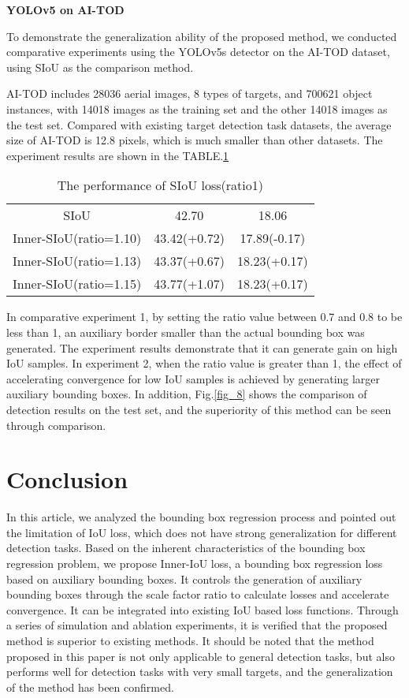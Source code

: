 \documentclass[lettersize,journal]{IEEEtran}
\begin{document}
	\newline
	\newline
	\textbf {YOLOv5 on AI-TOD}
	\par To demonstrate the generalization ability of the proposed method, we conducted comparative experiments using the YOLOv5s detector on the AI-TOD dataset\cite{ref21}, using SIoU\cite{ref5} as the comparison method.
	
	AI-TOD includes 28036 aerial images, 8 types of targets, and 700621 object instances, with 14018 images as the training set and the other 14018 images as the test set. Compared with existing target detection task datasets, the average size of AI-TOD is 12.8 pixels, which is much smaller than other datasets. The experiment results are shown in the TABLE.\ref{tab:mytable2}
	\begin{table}[h]
		\centering
		\begin{tabular}{ccc}
			\toprule &  &  \\
			\midrule SIoU & 42.70 & 18.06 \\
			Inner-SIoU(ratio=1.10) & 43.42(+0.72) & 17.89(-0.17) \\
			Inner-SIoU(ratio=1.13) & 43.37(+0.67) & 18.23(+0.17) \\
			Inner-SIoU(ratio=1.15) & 43.77(+1.07) & 18.23(+0.17) \\
			\bottomrule \end{tabular}
		\caption{The performance of SIoU loss(ratio1)}
		\label{tab:mytable2}
	\end{table}
	\par In comparative experiment 1, by setting the ratio value between 0.7 and 0.8 to be less than 1, an auxiliary border smaller than the actual bounding box was generated. The experiment results demonstrate that it can generate gain on high IoU samples. In experiment 2, when the ratio value is greater than 1, the effect of accelerating convergence for low IoU samples is achieved by generating larger auxiliary bounding boxes. In addition, Fig.\ref{fig_8} shows the comparison of detection results on the test set, and the superiority of this method can be seen through comparison.
	\section{Conclusion}
	\par In this article, we analyzed the bounding box regression process and pointed out the limitation of IoU loss, which does not have strong generalization for different detection tasks. Based on the inherent characteristics of the bounding box regression problem, we propose Inner-IoU loss, a bounding box regression loss based on auxiliary bounding boxes. It controls the generation of auxiliary bounding boxes through the scale factor ratio to calculate losses and accelerate convergence. It can be integrated into existing IoU based loss functions.
	Through a series of simulation and ablation experiments, it is verified that the proposed method is superior to existing methods. It should be noted that the method proposed in this paper is not only applicable to general detection tasks, but also performs well for detection tasks with very small targets, and the generalization of the method has been confirmed.
\end{document}
